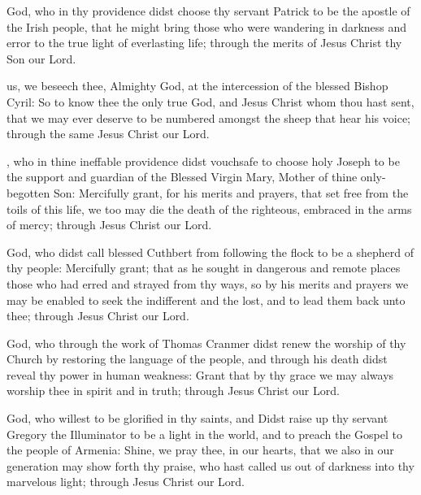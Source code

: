  God, who in thy providence didst choose thy servant Patrick to be the apostle of the Irish people, that he might bring those who were wandering in darkness and error to the true light of everlasting life; through the merits of Jesus Christ thy Son our Lord.

 us, we beseech thee, Almighty God, at the intercession of the blessed Bishop Cyril: So to know thee the only true God, and Jesus Christ whom thou hast sent, that we may ever deserve to be numbered amongst the sheep that hear his voice; through the same Jesus Christ our Lord.

, who in thine ineffable providence didst vouchsafe to choose holy Joseph to be the support and guardian of the Blessed Virgin Mary, Mother of thine only-begotten Son: Mercifully grant, for his merits and prayers, that set free from the toils of this life, we too may die the death of the righteous, embraced in the arms of mercy; through Jesus Christ our Lord.

 God, who didst call blessed Cuthbert from following the flock to be a shepherd of thy people: Mercifully grant; that as he sought in dangerous and remote places those who had erred and strayed from thy ways, so by his merits and prayers we may be enabled to seek the indifferent and the lost, and to lead them back unto thee; through Jesus Christ our Lord.

 God, who through the work of Thomas Cranmer didst renew the worship of thy Church by restoring the language of the people, and through his death didst reveal thy power in human weakness: Grant that by thy grace we may always worship thee in spirit and in truth; through Jesus Christ our Lord.

 God, who willest to be glorified in thy saints, and Didst raise up thy servant Gregory the Illuminator to be a light in the world, and to preach the Gospel to the people of Armenia: Shine, we pray thee, in our hearts, that we also in our generation may show forth thy praise, who hast called us out of darkness into thy marvelous light; through Jesus Christ our Lord.

